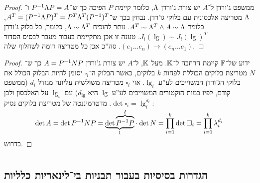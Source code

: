 \documentclass[name=רשימות אלגברה לינארית 2א]{../../../tex/classes/megasumPreamble}
\begin{document}
	\begin{proof}
		ממשפט ג'ורדן ל־$A$ יש צורת ג'ורדן $\Lambda$, כלומר קיימת $P$ הפיכה כך ש־$P^{-1} \Lambda P = A$ ו־$\Lambda$ מטריצה אלכסונית עם בלוקי גו'רדן. נבחין בכך ש־$A^{T} = (P^{-1} \Lambda P)^{T} = P^{T}\Lambda^{T}(P^{-1})^{T}$, כלומר $A^{T} \sim \Lambda^{T} \land A \sim \Lambda$. נותר להוכיח $\Lambda \sim \Lambda^{T}$, כלומר, כל בלוק ג'ורדן $J_i(\lg) \sim J_i(\lg)^{T}$. טענה זו אכן מתקיימת בעבור מעבר לבסיס הסדור $(e_1 \dots e_n) \to (e_n \dots e_1)$. סה''כ אכן כל מטריצה דומה לשחלוף שלה. 
	\end{proof}
	\begin{proof}
		ידוע של־$\mathbb{F}$ קיימת הרחבה ל־$\mathbb{K}$. מעל $\mathbb{K}$, ל־$A$ יש צורת ג'ורדן $A = P^{-1} N P$ כך ש־$N$ מטריצת בלוקים הכוללת לפחות $k$ בלוקים, כאשר הבלוק ה־$\square_i$ יסומן להיות הבלוק הכולל את בלוקי הג'ורדן המשוייכים לע''ע $\lg_i$. אזי $\square_i$ מטריצה משולשית עליונה מגודל $d_i$ (ממשפט קודם, לפיו כמות הוקטורים המשוייכים לע''ע $\lg$ היא $d_\lg$) עם $\lg_i$ על האלכסון ולכן $\det \square_i = \lg_i^{d_i}$. מדטרמיננטה של מטריצת בלוקים נסיק:
		\[ \det A = \det P^{-1} NP = \smash{\underbrace{\det\smash{\overbrace{P^{-1} P}^{I}}}_{1}} \cdot \det N = \prod_{i = 1}^{k} \det\square_i = \prod_{i = 1}^{k}\lambda_i^{d_i} \]
		כדרוש. 
	\end{proof}
	
	
	\npage
	
	
	
	\section[תבניות בי־לינאריות]{}
	\subsection{הגדרות בסיסיות בעבור תבניות בי־לינאריות כלליות}
	
\end{document}
